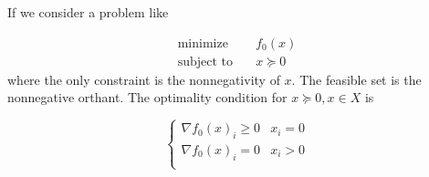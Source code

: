 If we consider a problem like

\begin{equation}
    \begin{aligned}
        \text{minimize} \quad & f_0(x) \\
        \text{subject to} \quad & x \succeq 0
    \end{aligned}
\end{equation}
%
where the only constraint is the nonnegativity of $x$. The feasible set is the nonnegative orthant. The optimality condition for $x \succeq 0, x \in X$ is


\begin{equation}
    \begin{cases}
        \nabla f_0(x)_i \geq 0 & x_i=0 \\
        \nabla f_0(x)_i = 0 & x_i>0 \\
    \end{cases}
\end{equation}
